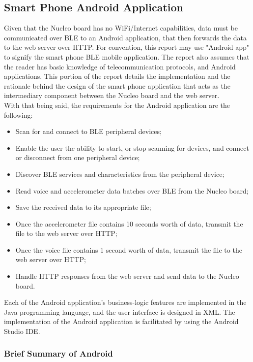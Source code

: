 \subsection{Smart Phone Android Application}

Given that the Nucleo board has no WiFi/Internet capabilities, data must be communicated over BLE to an Android application, that then forwards the data to the web server over HTTP. For convention, this report may use "Android app" to signify the smart phone BLE mobile application. The report also assumes that the reader has basic knowledge of telecommunication protocols, and Android applications. This portion of the report details the implementation and the rationale behind the design of the smart phone application that acts as the intermediary component between the Nucleo board and the web server.\\
With that being said, the requirements for the Android application are the following:

\begin{itemize}
    \item Scan for and connect to BLE peripheral devices;
    \item Enable the user the ability to start, or stop scanning for devices, and connect or disconnect from one peripheral device;
    \item Discover BLE services and characteristics from the peripheral device;
    \item Read voice and accelerometer data batches over BLE from the Nucleo board;
    \item Save the received data to its appropriate file;
    \item Once the accelerometer file contains 10 seconds worth of data, transmit the file to the web server over HTTP;
    \item Once the voice file contains 1 second worth of data, transmit the file to the web server over HTTP;
    \item Handle HTTP responses from the web server and send data to the Nucleo board.
\end{itemize}

Each of the Android application's business-logic features are implemented in the Java programming language, and the user interface is designed in XML. The implementation of the Android application is facilitated by using the Android Studio IDE.\\

\subsubsection{Brief Summary of Android}


